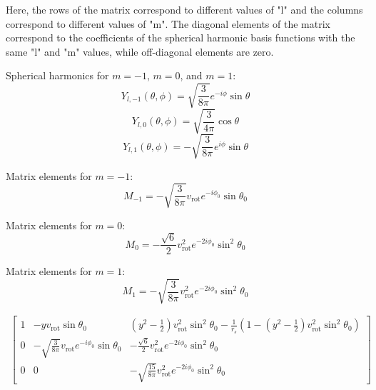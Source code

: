 \documentclass[modern]{aastex631}
\begin{document}
Here, the rows of the matrix correspond to different values of "l" and the columns correspond to different values of "m". 
The diagonal elements of the matrix correspond to the coefficients of the spherical harmonic basis functions with the same "l" and "m" values, 
while off-diagonal elements are zero.

Spherical harmonics for \(m = -1\), \(m = 0\), and \(m = 1\):
$$Y_{l,-1}(\theta, \phi) = \sqrt{\frac{3}{8\pi}}e^{-i\phi}\sin\theta$$
$$Y_{l,0}(\theta, \phi) = \sqrt{\frac{3}{4\pi}}\cos\theta$$
$$Y_{l,1}(\theta, \phi) = -\sqrt{\frac{3}{8\pi}}e^{i\phi}\sin\theta$$

Matrix elements for \(m = -1\):
$$M_{-1} = -\sqrt{\frac{3}{8\pi}}v_{\text{rot}}e^{-i\phi_0}\sin\theta_0$$

Matrix elements for \(m = 0\):
$$M_{0} = -\frac{\sqrt{6}}{2}v_{\text{rot}}^2e^{-2i\phi_0}\sin^2\theta_0$$

Matrix elements for \(m = 1\):
$$M_{1} = -\sqrt{\frac{3}{8\pi}}v_{\text{rot}}^2e^{-2i\phi_0}\sin^2\theta_0$$

\begin{multline}
    \begin{bmatrix}
        1 & -yv_{\text{rot}}\sin\theta_0 & (y^2 - \frac{1}{2})v_{\text{rot}}^2\sin^2\theta_0 - \frac{1}{r_s}(1 - (y^2 - \frac{1}{2})v_{\text{rot}}^2\sin^2\theta_0) \\
        0 & -\sqrt{\frac{3}{8\pi}}v_{\text{rot}}e^{-i\phi_0}\sin\theta_0 & -\frac{\sqrt{6}}{2}v_{\text{rot}}^2e^{-2i\phi_0}\sin^2\theta_0 \\
        0 & 0 & -\sqrt{\frac{15}{8\pi}}v_{\text{rot}}^2e^{-2i\phi_0}\sin^2\theta_0
    \end{bmatrix}
\end{multline}



\end{document}
